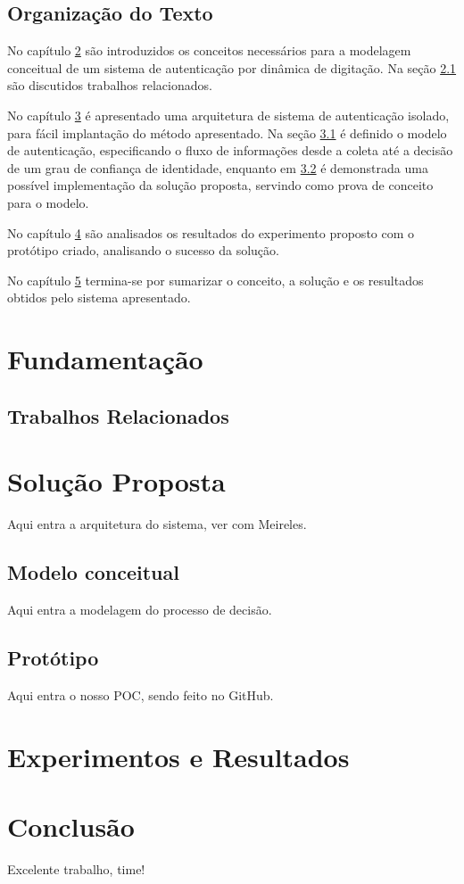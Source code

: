 \documentclass[pfc]{imetex}
\begin{document}
\section{Organização do Texto}
No capítulo \ref{fundamentaca} são introduzidos os conceitos necessários para a modelagem conceitual de um sistema de autenticação por dinâmica de digitação. Na seção \ref{relacionados} são discutidos trabalhos relacionados.

No capítulo \ref{solucao} é apresentado uma arquitetura de sistema de autenticação isolado, para fácil implantação do método apresentado. Na seção \ref{modelo} é definido o modelo de autenticação, especificando o fluxo de informações desde a coleta até a decisão de um grau de confiança de identidade, enquanto em \ref{prototipo} é demonstrada uma possível implementação da solução proposta, servindo como prova de conceito para o modelo.

No capítulo \ref{experimentos} são analisados os resultados do experimento proposto com o protótipo criado, analisando o sucesso da solução.

No capítulo \ref{conclusao} termina-se por sumarizar o conceito, a solução e os resultados obtidos pelo sistema apresentado.

\chapter{Fundamentação}
\label{fundamentaca}


\section{Trabalhos Relacionados}
\label{relacionados}


\chapter{Solução Proposta}
\label{solucao}
Aqui entra a arquitetura do sistema, ver com Meireles.\

\section{Modelo conceitual}
\label{modelo}
Aqui entra a modelagem do processo de decisão.

\section{Protótipo}
\label{prototipo}
Aqui entra o nosso POC, sendo feito no GitHub.

\chapter{Experimentos e Resultados}
\label{experimentos}

\chapter{Conclusão}
\label{conclusao}

Excelente trabalho, time!
\end{document}
